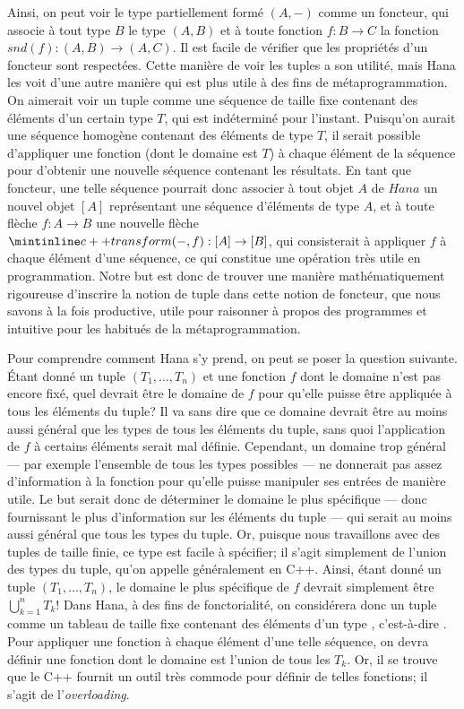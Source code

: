 Ainsi, on peut voir le type partiellement formé $(A, -)$ comme un foncteur,
qui associe à tout type $B$ le type $(A, B)$ et à toute fonction $f : B \to C$
la fonction $snd(f) : (A, B) \to (A, C)$. Il est facile de vérifier que les
propriétés d'un foncteur sont respectées. Cette manière de voir les tuples
a son utilité, mais Hana les voit d'une autre manière qui est plus utile à
des fins de métaprogrammation. On aimerait voir un tuple comme une séquence
de taille fixe contenant des éléments d'un certain type $T$, qui est indéterminé
pour l'instant. Puisqu'on aurait une séquence homogène contenant des éléments
de type $T$, il serait possible d'appliquer une fonction (dont le domaine est
$T$) à chaque élément de la séquence pour d'obtenir une nouvelle séquence
contenant les résultats. En tant que foncteur, une telle séquence pourrait
donc associer à tout objet $A$ de $Hana$ un nouvel objet $[A]$ représentant
une séquence d'éléments de type $A$, et à toute flèche $f : A \to B$ une
nouvelle flèche $\icpp{transform(-, f)} : [A] \to [B]$, qui consisterait à
appliquer $f$ à chaque élément d'une séquence, ce qui constitue une opération
très utile en programmation. Notre but est donc de trouver une manière
mathématiquement rigoureuse d'inscrire la notion de tuple dans cette notion
de foncteur, que nous savons à la fois productive, utile pour raisonner à
propos des programmes et intuitive pour les habitués de la métaprogrammation.

Pour comprendre comment Hana s'y prend, on peut se poser la question suivante.
Étant donné un tuple $(T_1, \hdots, T_n)$ et une fonction $f$ dont le domaine
n'est pas encore fixé, quel devrait être le domaine de $f$ pour qu'elle puisse
être appliquée à tous les éléments du tuple? Il va sans dire que ce domaine
devrait être au moins aussi général que les types de tous les éléments du
tuple, sans quoi l'application de $f$ à certains éléments serait mal définie.
Cependant, un domaine trop général --- par exemple l'ensemble de tous les types
possibles --- ne donnerait pas assez d'information à la fonction pour qu'elle
puisse manipuler ses entrées de manière utile. Le but serait donc de déterminer
le domaine le plus spécifique --- donc fournissant le plus d'information sur
les éléments du tuple --- qui serait au moins aussi général que tous les types
du tuple. Or, puisque nous travaillons avec des tuples de taille finie, ce type
est facile à spécifier; il s'agit simplement de l'union des types du tuple,
qu'on appelle généralement  en C++. Ainsi, étant donné un tuple
$(T_1, \hdots, T_n)$, le domaine le plus spécifique de $f$ devrait simplement
être $\bigcup_{k=1}^n T_k$! Dans Hana, à des fins de fonctorialité, on
considérera donc un tuple  comme un tableau de
taille fixe contenant des éléments d'un type , c'est-à-dire
. Pour appliquer une fonction à chaque
élément d'une telle séquence, on devra définir une fonction dont le domaine
est l'union de tous les $T_k$. Or, il se trouve que le C++ fournit un outil
très commode pour définir de telles fonctions; il s'agit de
l'\textit{overloading}.

